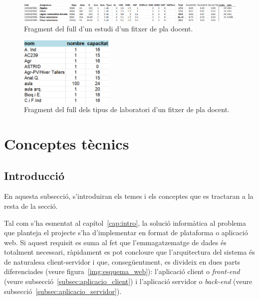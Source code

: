 \documentclass[a4paper,12pt]{ThesisStyle}
\begin{document}
\begin{figure}[H]
  \centering
  \includegraphics[width=\textwidth]{assets/figs/fitxerPlaDocent.png}
  \caption{\label{img:frag_pla_docent}Fragment del full d'un estudi d'un fitxer de pla docent.}
\end{figure}

\begin{figure}[H]
  \centering
  \includegraphics[width=0.4\textwidth]{assets/figs/fitxerPlaDocentLabs.png}
  \caption{\label{img:frag_pla_docent_labs}Fragment del full dels tipus de laboratori d'un fitxer de pla docent.}
\end{figure}


\section{Conceptes tècnics}
\label{sec:conceptes_tecnics}

\subsection{Introducció}
\label{subsec:intro_conceptes_tecnics}

En aquesta subsecció, s'introduiran els temes i els conceptes que es tractaran a la resta de la secció.

Tal com s'ha esmentat al capítol~\ref{cap:intro}, la solució informàtica al problema que planteja el projecte s'ha d'implementar en format de plataforma o aplicació web. Si aquest requisit es suma al fet que l'emmagatzematge de dades és totalment necessari, ràpidament es pot concloure que l'arquitectura del sistema és de naturalesa client-servidor i que, consegüentment, es divideix en dues parts diferenciades (veure figura~\ref{img:esquema_web}): l'aplicació client o \textit{front-end} (veure subsecció~\ref{subsec:aplicacio_client}) i l'aplicació servidor o \textit{back-end} (veure subsecció~\ref{subsec:aplicacio_servidor}).
\end{document}
